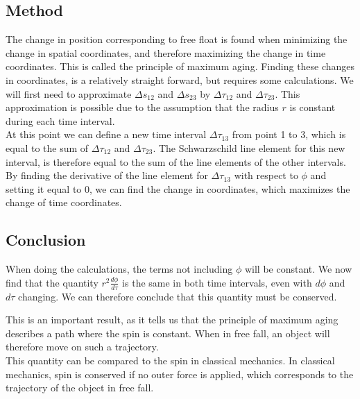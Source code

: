 \documentclass[reprint,english,notitlepage]{revtex4-2}
\begin{document}
    \subsection{Method}\label{subsec:method2}
        The change in position corresponding to free float is found when minimizing the change in spatial coordinates, and therefore maximizing the change in time coordinates.
        This is called the principle of maximum aging.
        Finding these changes in coordinates, is a relatively straight forward, but requires some calculations.
        We will first need to approximate $\Delta s_{12}$ and $\Delta s_{23}$ by $\Delta \tau_{12}$ and $\Delta \tau_{23}$.
        This approximation is possible due to the assumption that the radius $r$ is constant during each time interval.\\

        At this point we can define a new time interval $\Delta \tau_{13}$ from point 1 to 3, which is equal to the sum of $\Delta \tau_{12}$ and $\Delta\tau_{23}$.
        The Schwarzschild line element for this new interval, is therefore equal to the sum of the line elements of the other intervals.\\

        By finding the derivative of the line element for $\Delta \tau_{13}$ with respect to $\phi$ and setting it equal to 0, we can find the change in coordinates, which maximizes the change of time coordinates.

    \subsection{Conclusion}\label{subsec:conclusion2}
        When doing the calculations, the terms not including $\phi$ will be constant.
        We now find that the quantity $r^2 \frac{d\phi}{d\tau}$ is the same in both time intervals, even with $d\phi$ and $d\tau$ changing.
        We can therefore conclude that this quantity must be conserved.

        This is an important result, as it tells us that the principle of maximum aging describes a path where the spin is constant.
        When in free fall, an object will therefore move on such a trajectory.\\

        This quantity can be compared to the spin in classical mechanics.
        In classical mechanics, spin is conserved if no outer force is applied, which corresponds to the trajectory of the object in free fall.
\end{document}
